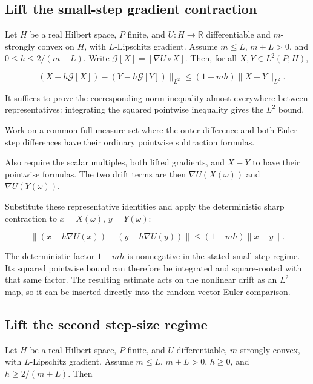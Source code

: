 \documentclass[11pt,a4paper]{report}
\begin{document}
\subsection{\texorpdfstring{Lift the small-step gradient contraction}{Lift the small-step gradient contraction}}
\label{report-step-UnadjustedLangevin-LpDrift-lean-6}


Let \(H\) be a real Hilbert space, \(P\) finite, and \(U:H\to\mathbb R\) differentiable and \(m\)-strongly convex on \(H\), with \(L\)-Lipschitz gradient. Assume \(m\le L\), \(m+L>0\), and \(0\le h\le2/(m+L)\). Write \(\mathcal G[X]=[\nabla U\circ X]\). Then, for all \(X,Y\in L^2(P;H)\),

\[\|(X-h\mathcal G[X])-(Y-h\mathcal G[Y])\|_{L^2}\le(1-mh)\|X-Y\|_{L^2}.\]

It suffices to prove the corresponding norm inequality almost everywhere between representatives: integrating the squared pointwise inequality gives the \(L^2\) bound.



Work on a common full-measure set where the outer difference and both Euler-step differences have their ordinary pointwise subtraction formulas.



Also require the scalar multiples, both lifted gradients, and \(X-Y\) to have their pointwise formulas. The two drift terms are then \(\nabla U(X(\omega))\) and \(\nabla U(Y(\omega))\).



Substitute these representative identities and apply the deterministic sharp contraction to \(x=X(\omega)\), \(y=Y(\omega)\):

\[\|(x-h\nabla U(x))-(y-h\nabla U(y))\|\le(1-mh)\|x-y\|.\]

The deterministic factor \(1-mh\) is nonnegative in the stated small-step regime. Its squared pointwise bound can therefore be integrated and square-rooted with that same factor. The resulting estimate acts on the nonlinear drift as an \(L^2\) map, so it can be inserted directly into the random-vector Euler comparison.

\subsection{\texorpdfstring{Lift the second step-size regime}{Lift the second step-size regime}}
\label{report-step-UnadjustedLangevin-LpDrift-lean-7}


Let \(H\) be a real Hilbert space, \(P\) finite, and \(U\) differentiable, \(m\)-strongly convex, with \(L\)-Lipschitz gradient. Assume \(m\le L\), \(m+L>0\), \(h\ge0\), and \(h\ge2/(m+L)\). Then
\end{document}
